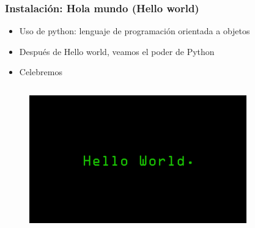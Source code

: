 \documentclass[10pt]{beamer}
\begin{document}
\begin{frame}
\frametitle{Instalaci\'on: Hola mundo (Hello world)}

\begin{beamerboxesrounded}[upper=uppercolor, lower=lowercolor, shadow=true]{} 

\begin{itemize}
 \item Uso de python: lenguaje de programaci\'on orientada a objetos
 \item Despu\'es de Hello world, veamos el poder de Python 
 \item Celebremos
\end{itemize}
\end{beamerboxesrounded}

\begin{columns}

\hspace{5mm}
\hspace{5mm}
\begin{column}{\textwidth}
 \begin{figure}
 \includegraphics[scale=0.35]{./Figures/hello-world.png} 
 \end{figure}
\end{column}%

\hspace{3mm}
\hspace{3mm}
\begin{column}{.33\textwidth}
\hspace{5mm}
\hspace{5mm}
\vspace{-3mm}
 \begin{figure}
 \end{figure}  
\end{column}%

\end{columns}

\end{frame}
\end{document}
